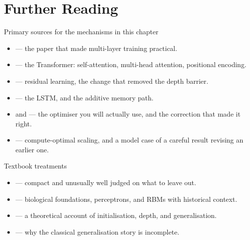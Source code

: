 
\section{Further Reading}

\begin{v3topic}{Primary sources for the mechanisms in this chapter}
\begin{itemize}
  \item {} ---
    the paper that made multi-layer training practical.
  \item {} --- the Transformer:
    self-attention, multi-head attention, positional encoding.
  \item {} --- residual learning, the change
    that removed the depth barrier.
  \item {} --- the LSTM, and the
    additive memory path.
  \item {} and
     --- the optimiser you will
    actually use, and the correction that made it right.
  \item {} --- compute-optimal
    scaling, and a model case of a careful result revising an earlier one.
\end{itemize}
\end{v3topic}

\begin{v3topic}{Textbook treatments}
\begin{itemize}
  \item {} --- compact and unusually well judged
    on what to leave out.
  \item {} --- biological foundations,
    perceptrons, and RBMs with historical context.
  \item {} --- a theoretical account
    of initialisation, depth, and generalisation.
  \item {} --- why the classical
    generalisation story is incomplete.
\end{itemize}
\end{v3topic}

